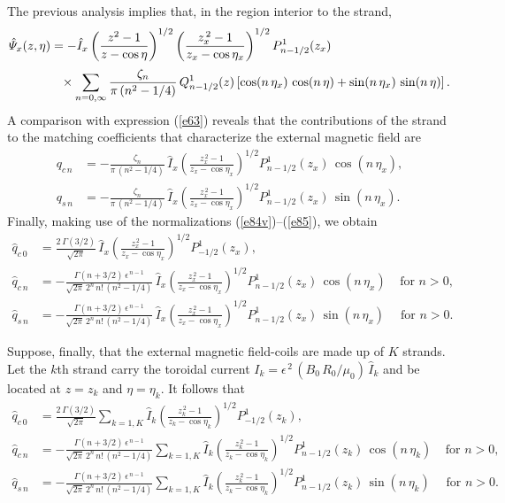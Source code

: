 \documentclass[12pt,prb,aps]{revtex4-1}
\begin{document}
The previous analysis implies that, in the region interior to the strand, 
\begin{align}
\hat{\mit\Psi}_x(z,\eta)& =  -\hat{I}_x \left(\frac{z^{2}-1}{z-\cos\eta}\right)^{1/2}\left(\frac{z_x^{\,2}-1}{z_x-\cos\eta_x}\right)^{1/2}P_{n-1/2}^1(z_x)\nonumber\\[0.5ex]&\phantom{=}\times\sum_{n=0,\infty} 
\frac{\zeta_n}{\pi\,(n^{2}-1/4)}\,Q_{n-1/2}^1(z)\left[\cos(n\,\eta_x)\,\cos(n\,\eta) + \sin(n\,\eta_x)\,\sin(n\,\eta)\right].
\end{align}
A comparison with expression (\ref{e63}) reveals that the contributions of the strand to the matching coefficients that characterize the
external magnetic field are
\begin{align}
q_{c\,n}&=-\frac{\zeta_n}{\pi\,(n^{2}-1/4)}\, \hat{I}_x\left(\frac{z_x^{\,2}-1}{z_x-\cos\eta_x}\right)^{1/2}P_{n-1/2}^1(z_x)\,\cos(n\,\eta_x),\\[0.5ex]
q_{s\,n}&=- \frac{\zeta_n}{\pi\,(n^{2}-1/4)}\,\hat{I}_x\left(\frac{z_x^{\,2}-1}{z_x-\cos\eta_x}\right)^{1/2}P_{n-1/2}^1(z_x)\,\sin(n\,\eta_x).
\end{align}
Finally, making use of the normalizations (\ref{e84v})--(\ref{e85}), we obtain
\begin{align}
\hat{q}_{c\,0} &= \frac{2\,\Gamma(3/2)}{\sqrt{2\pi}}\,\hat{I}_x\left(\frac{z_x^{\,2}-1}{z_x-\cos\eta_x}\right)^{1/2}P_{-1/2}^1(z_x),\\[0.5ex]
\hat{q}_{c\,n} &=-\frac{\Gamma(n+3/2)\,\epsilon^{\,n-1}}{\sqrt{2\pi}\,2^{n}\,n!\,(n^{2}-1/4)} \,\hat{I}_x\left(\frac{z_x^{\,2}-1}{z_x-\cos\eta_x}\right)^{1/2}P_{n-1/2}^1(z_x)\,\cos(n\,\eta_x)~~~~~\mbox{for $n>0$},\\[0.5ex]
\hat{q}_{s\,n} &=-\frac{\Gamma(n+3/2)\,\epsilon^{\,n-1}}{\sqrt{2\pi}\,2^{n}\,n!\,(n^{2}-1/4)} \,\hat{I}_x\left(\frac{z_x^{\,2}-1}{z_x-\cos\eta_x}\right)^{1/2}P_{n-1/2}^1(z_x)\,\sin(n\,\eta_x)~~~~~\,\mbox{for $n>0$}.
\end{align}

Suppose, finally, that the external magnetic field-coils are made up of $K$ strands. Let the $k$th strand carry the toroidal current $I_k= \epsilon^{\,2}\,(B_0\,R_0/\mu_0)\,\hat{I}_k$ and be located
at $z=z_k$ and $\eta=\eta_k$. It follows that
\begin{align}
\hat{q}_{c\,0} &=\frac{2\,\Gamma(3/2)}{\sqrt{2\pi}} \sum_{k=1,K}\hat{I}_k\left(\frac{z_k^{\,2}-1}{z_k-\cos\eta_k}\right)^{1/2}P_{-1/2}^1(z_k),\label{e150}\\[0.5ex]
\hat{q}_{c\,n} &=-\frac{\Gamma(n+3/2)\,\epsilon^{\,n-1}}{\sqrt{2\pi}\,2^{n}\,n!\,(n^{2}-1/4)} \sum_{k=1,K}\hat{I}_k\left(\frac{z_k^{\,2}-1}{z_k-\cos\eta_k}\right)^{1/2}P_{n-1/2}^1(z_k)\,\cos(n\,\eta_k)~~~~~\mbox{for $n>0$},\label{e151}\\[0.5ex]
\hat{q}_{s\,n} &=-\frac{\Gamma(n+3/2)\,\epsilon^{\,n-1}}{\sqrt{2\pi}\,2^{n}\,n!\,(n^{2}-1/4)}\sum_{k=1,K} \hat{I}_k\left(\frac{z_k^{\,2}-1}{z_k-\cos\eta_k}\right)^{1/2}P_{n-1/2}^1(z_k)\,\sin(n\,\eta_k)~~~~~\,\mbox{for $n>0$}.\label{e152}
\end{align}
\end{document}
